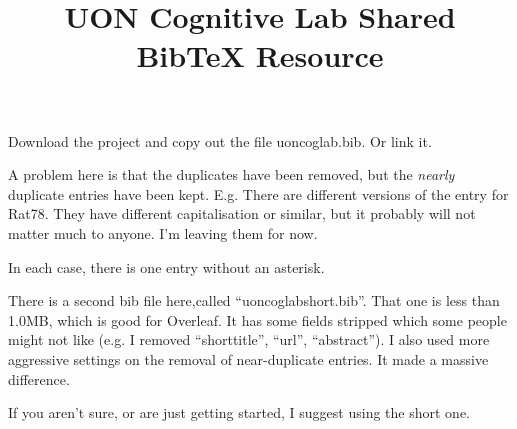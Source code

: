 \documentclass{apa}
\begin{document}
\title{UON Cognitive Lab Shared BibTeX Resource}

Download the project and copy out the file uoncoglab.bib. Or link it.

A problem here is that the duplicates have been removed, but the \emph{nearly} duplicate entries have been kept. E.g. There are different versions of the entry for Rat78. They have different capitalisation or similar, but it probably will not matter much to anyone. I'm leaving them for now. 
\cite{ratcliff1978theory}
\cite{ratcliff1978theory*1}
\cite{ratcliff1978theory*2}

In each case, there is one entry without an asterisk. 











There is a second bib file here,called ``uoncoglabshort.bib''. That one is less than 1.0MB, which is good for Overleaf. It has some fields stripped which some people might not like (e.g. I removed ``shorttitle'', ``url'', ``abstract''). I also used more aggressive settings on the removal of near-duplicate entries. It made a massive difference. 

If you aren't sure, or are just getting started, I suggest using the short one.


\end{document}
